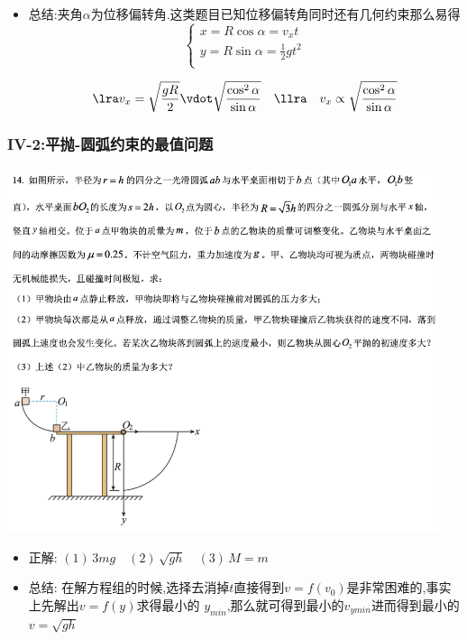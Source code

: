 \documentclass{article}
\begin{document}
\begin{itemize}
    \item 总结:夹角$\alpha$为位移偏转角.这类题目已知位移偏转角同时还有几何约束那么易得
          $$
              \begin{cases}
                  x = R \cos{\alpha} = v_{x} t             \\
                  y = R \sin{\alpha} = \frac{1}{2} g t^{2} \\
              \end{cases}
          $$

          $$
              \lra v_{x} = \sqrt{\frac{gR}{2}} \vdot \sqrt{\frac{\cos^{2}{\alpha}}{\sin{\alpha}}} \quad  \llra \quad  v_{x}  \propto  \sqrt{\frac{\cos^{2}{\alpha}}{\sin{\alpha}}}
          $$

\end{itemize}

\vspace{2em}

\subsubsection{IV-2:平抛-圆弧约束的最值问题}
\includegraphics[width=0.95\textwidth,keepaspectratio]{./pictures/1.2-6.png}


\begin{itemize}
    \item 正解: \quad $(1) \, 3mg \quad (2) \, \sqrt{gh} \quad (3) \, M = m$
    \item 总结: \quad 在解方程组的时候,选择去消掉$t$直接得到$v = f(v_{0})$是非常困难的,事实上先解出$v = f(y)$求得最小的
          $y_{min}$,那么就可得到最小的$v_{ymin}$进而得到最小的$v = \sqrt{gh}$
\end{itemize}
\end{document}
